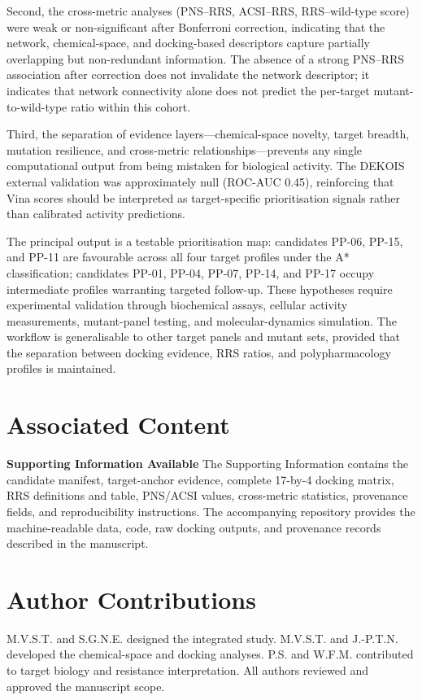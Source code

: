 \documentclass[journal=jcisd8,manuscript=article]{achemso}
\begin{document}
Second, the cross-metric analyses (PNS--RRS, ACSI--RRS, RRS--wild-type score) were weak or non-significant after Bonferroni correction, indicating that the network, chemical-space, and docking-based descriptors capture partially overlapping but non-redundant information. The absence of a strong PNS--RRS association after correction does not invalidate the network descriptor; it indicates that network connectivity alone does not predict the per-target mutant-to-wild-type ratio within this cohort.

Third, the separation of evidence layers---chemical-space novelty, target breadth, mutation resilience, and cross-metric relationships---prevents any single computational output from being mistaken for biological activity. The DEKOIS external validation was approximately null (ROC-AUC \num{0.45}), reinforcing that Vina scores should be interpreted as target-specific prioritisation signals rather than calibrated activity predictions.

The principal output is a testable prioritisation map: candidates PP-06, PP-15, and PP-11 are favourable across all four target profiles under the A* classification; candidates PP-01, PP-04, PP-07, PP-14, and PP-17 occupy intermediate profiles warranting targeted follow-up. These hypotheses require experimental validation through biochemical assays, cellular activity measurements, mutant-panel testing, and molecular-dynamics simulation. The workflow is generalisable to other target panels and mutant sets, provided that the separation between docking evidence, RRS ratios, and polypharmacology profiles is maintained.

\section*{Associated Content}
\textbf{Supporting Information Available}
The Supporting Information contains the candidate manifest, target-anchor evidence, complete 17-by-4 docking matrix, RRS definitions and table, PNS/ACSI values, cross-metric statistics, provenance fields, and reproducibility instructions. The accompanying repository provides the machine-readable data, code, raw docking outputs, and provenance records described in the manuscript.

\section*{Author Contributions}
M.V.S.T. and S.G.N.E. designed the integrated study. M.V.S.T. and J.-P.T.N. developed the chemical-space and docking analyses. P.S. and W.F.M. contributed to target biology and resistance interpretation. All authors reviewed and approved the manuscript scope.
\end{document}
